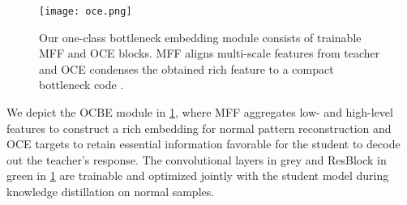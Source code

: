 \documentclass[10pt,twocolumn,letterpaper]{article}
\begin{document}
\begin{figure}[t]
  \centering
   \texttt{[image: oce.png]}

   \caption{Our one-class bottleneck embedding module consists of trainable MFF and OCE blocks. MFF aligns multi-scale features from teacher  and OCE condenses the obtained rich feature to a compact bottleneck code .} \label{fig:oce}
\end{figure}

We depict the OCBE module in \cref{fig:oce}, where MFF aggregates low- and high-level features to construct a rich embedding for normal pattern reconstruction and OCE targets to retain essential information favorable for the student to decode out the teacher's response. The convolutional layers in grey and ResBlock in green in \cref{fig:oce} are trainable and optimized jointly with the student model  during knowledge distillation on normal samples. 
\end{document}
